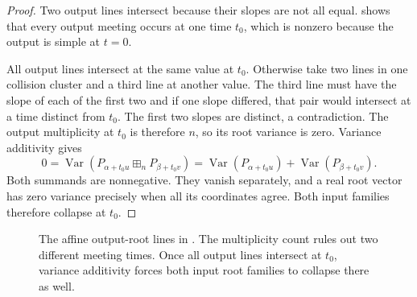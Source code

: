\documentclass[12pt,reqno]{amsart}
\theoremstyle{definition}
\theoremstyle{remark}
\newcommand{\Var}{\operatorname{Var}}
\begin{document}
\begin{proof}
Two output lines intersect because their slopes are not all equal.
 shows that every output
meeting occurs at one time \(t_0\), which is nonzero because the
output is simple at \(t=0\).

All output lines intersect at the same value at \(t_0\).  Otherwise take two
lines in one collision cluster and a third line at another value.  The third line must have the slope of each of the first two and if one slope differed, that pair would intersect at a time distinct from \(t_0\).  The first two slopes are distinct, a contradiction.  The output multiplicity at \(t_0\) is therefore \(n\), so its root variance is zero. Variance additivity gives
\[
 0=\Var(P_{\alpha+t_0u}\boxplus_nP_{\beta+t_0v})
 =\Var(P_{\alpha+t_0u})+\Var(P_{\beta+t_0v}).
\]
Both summands are nonnegative.  They vanish separately, and a real root
vector has zero variance precisely when all its coordinates agree. Both
input families therefore collapse at \(t_0\).
\end{proof}

\begin{figure}[!htbp]
\centering
{}
\caption{The affine output-root lines in
.  The multiplicity count rules out two
different meeting times.  Once all output lines intersect at \(t_0\), variance
additivity forces both input root families to collapse there as well.}
\label{fig:affine-root-lines}
\end{figure}
\end{document}
